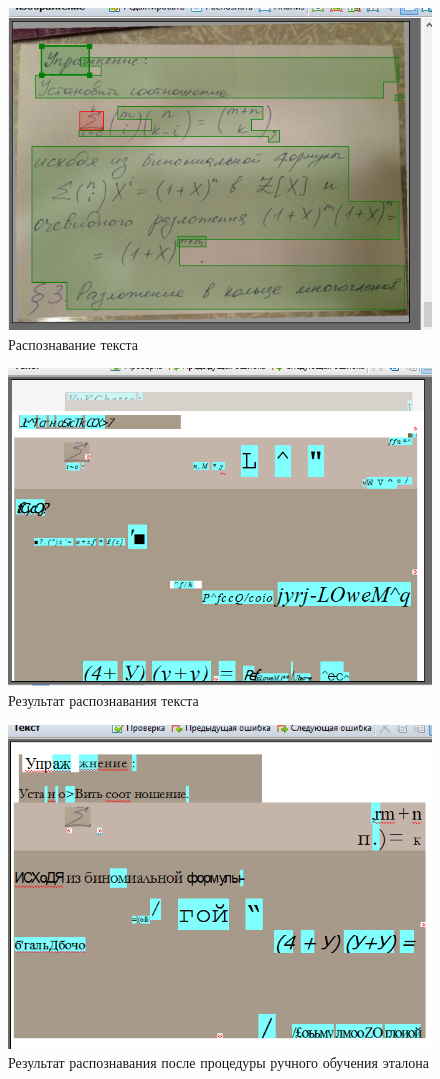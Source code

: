 		\begin{figure}[h]
			\centering
			\includegraphics[width=0.7\linewidth]{images/handwrite-no-template}
			\caption{Распознавание текста}
			\label{fig:handwrite-no-template}
		\end{figure}
		\begin{figure}[h]
			\centering
			\includegraphics[width=0.7\linewidth]{images/handwrite-no-template2}
			\caption{Результат распознавания текста}
			\label{fig:handwrite-no-template2}
		\end{figure}
		\begin{figure}[h]
			\centering
			\includegraphics[width=0.7\linewidth]{images/handwrite-with-template}
			\caption{Результат распознавания после процедуры ручного обучения эталона}
			\label{fig:handwrite-with-template}
		\end{figure}
	

